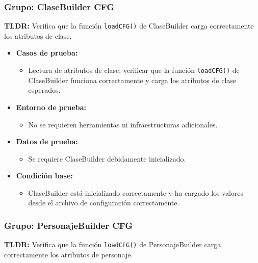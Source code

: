 \documentclass{article}
\begin{document}
\subsubsection{Grupo: ClaseBuilder CFG}
\textbf{TLDR:} Verifica que la función \texttt{loadCFG()} de ClaseBuilder carga correctamente los atributos de clase.

\begin{itemize}
	\item \textbf{Casos de prueba:}
	\begin{itemize}
		\item Lectura de atributos de clase: verificar que la función \texttt{loadCFG()} de ClaseBuilder funciona correctamente y carga los atributos de clase esperados.
	\end{itemize}
	
	\item \textbf{Entorno de prueba:}
	\begin{itemize}
		\item No se requieren herramientas ni infraestructuras adicionales.
	\end{itemize}
	
	\item \textbf{Datos de prueba:}
	\begin{itemize}
		\item Se requiere ClaseBuilder debidamente inicializado.
	\end{itemize}
	
	\item \textbf{Condición base:}
	\begin{itemize}
		\item ClaseBuilder está inicializado correctamente y ha cargado los valores desde el archivo de configuración correctamente.
	\end{itemize}
\end{itemize}


\subsubsection{Grupo: PersonajeBuilder CFG}
\textbf{TLDR:} Verifica que la función \texttt{loadCFG()} de PersonajeBuilder carga correctamente los atributos de personaje.
\end{document}
